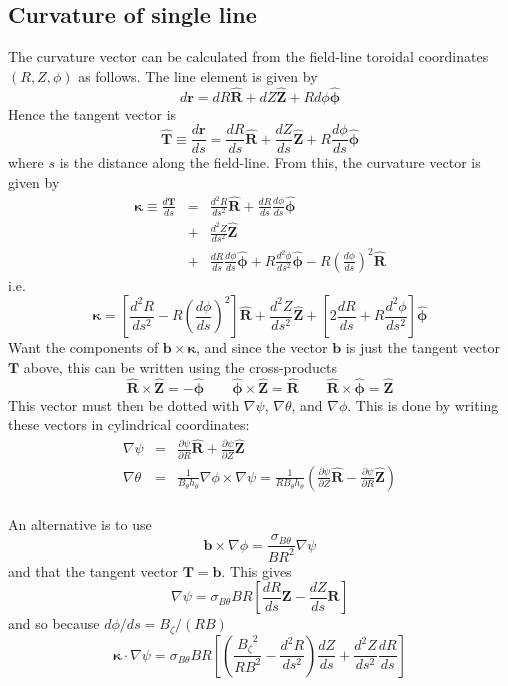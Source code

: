 \documentclass[12pt, a4paper]{article}
\newcommand{\dd}[2]{\ensuremath{\frac{d #1}{d #2}}}
\newcommand{\ddd}[2]{\ensuremath{\frac{d^2 #1}{d #2^2}}}
\newcommand{\deriv}[2]{\ensuremath{\frac{\partial #1}{\partial #2}}}
\newcommand{\hthe}{\ensuremath{h_\theta}}
\newcommand{\Bp}{\ensuremath{B_\theta}}
\newcommand{\Bt}{\ensuremath{B_\zeta}}
\newcommand{\Vec}[1]{\ensuremath{\mathbf{#1}}}
\newcommand{\bvec}{\Vec{b}}
\newcommand{\kvec}{\Vec{\kappa}}
\newcommand{\Rvec}{\ensuremath{\hat{\Vec{R}}}}
\newcommand{\Zvec}{\ensuremath{\hat{\Vec{Z}}}}
\newcommand{\phivec}{\ensuremath{\hat{\Vec{\phi}}}}
\newcommand{\sbp}{\ensuremath{\sigma_{B\theta}}}
\begin{document}
\subsection{Curvature of single line}

The curvature vector can be calculated from the field-line toroidal
coordinates $\left(R,Z,\phi\right)$ as follows. The line element
is given by
\[
d\Vec{r} = dR\Rvec + dZ\Zvec + Rd\phi\phivec
\]
Hence the tangent vector is
\[
\hat{\Vec{T}} \equiv \dd{\Vec{r}}{s} = \dd{R}{s}\Rvec + \dd{Z}{s}\Zvec + R\dd{\phi}{s}\phivec
\]
where $s$ is the distance along the field-line. From this, the curvature vector
is given by
\begin{eqnarray*}
\kvec \equiv \dd{\Vec{T}}{s} &=& \ddd{R}{s}\Rvec + \dd{R}{s}\dd{\phi}{s}\phivec \\
&+& \ddd{Z}{s}\Zvec \\
&+& \dd{R}{s}\dd{\phi}{s}\phivec + R\ddd{\phi}{s}\phivec - R\left(\dd{\phi}{s}\right)^2 \Rvec
\end{eqnarray*}
i.e.
\begin{equation}
\kvec = \left[\ddd{R}{s} - R\left(\dd{\phi}{s}\right)^2\right]\Rvec + \ddd{Z}{s}\Zvec + \left[2\dd{R}{s} + R\ddd{\phi}{s}\right]\phivec
\label{eq:kappaline}
\end{equation}
Want the components of $\Vec{b}\times\kvec$, and since the vector $\Vec{b}$
is just the tangent vector $\Vec{T}$ above, this can be written using the
cross-products
\[
\Rvec\times\Zvec = -\phivec \qquad \phivec\times\Zvec = \Rvec \qquad \Rvec\times\phivec = \Zvec
\]
This vector must then be dotted with $\nabla\psi$, $\nabla\theta$, and $\nabla\phi$. This is done by writing these vectors in cylindrical coordinates:
\begin{eqnarray*}
\nabla\psi &=& \deriv{\psi}{R}\hat{\Vec{R}} + \deriv{\psi}{Z}\hat{\Vec{Z}} \\
\nabla\theta &=& \frac{1}{\Bp\hthe}\nabla\phi\times\nabla\psi = \frac{1}{R\Bp\hthe}\left(\deriv{\psi}{Z}\hat{\Vec{R}} - \deriv{\psi}{R}\hat{\Vec{Z}}\right) \\
\end{eqnarray*}

An alternative is to use
\[
\bvec \times \nabla\phi = \frac{\sbp}{BR^2}\nabla\psi
\]
and that the tangent vector $\Vec{T} = \bvec$. This gives
\begin{equation}
\nabla\psi = \sbp BR\left[\frac{dR}{ds}\Vec{Z} - \frac{dZ}{ds}\Vec{R}\right] 
\label{eq:flinegradpsi}
\end{equation}
and so because $d\phi / ds = \Bt / \left(RB\right)$
\begin{equation}
\kvec\cdot\nabla\psi = \sbp BR\left[ \left( \frac{\Bt^2}{RB^2} - \ddd{R}{s}\right)\dd{Z}{s} + \ddd{Z}{s}\frac{dR}{ds} \right]
\label{eq:flinekappsi}
\end{equation}
\end{document}
